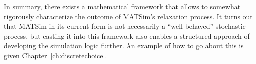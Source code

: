 
In summary, there exists a mathematical framework that allows to somewhat
rigorously characterize the outcome of MATSim's relaxation process.
It turns out that MATSim in its current form is not necessarily a ``well-behaved''
stochastic process, but casting it into this framework also enables a structured
approach of developing the simulation logic further. An example of how to go
about this is given Chapter~\ref{ch:discretechoice}.





